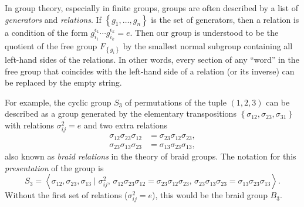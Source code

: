 \documentclass[english,letterpaper]{article}%
\numberwithin{equation}{section}
\numberwithin{figure}{section}
\numberwithin{table}{section}
\theoremstyle{definition}
\theoremstyle{definition}
\theoremstyle{definition}
\theoremstyle{plain}
\theoremstyle{plain}
\theoremstyle{plain}
\theoremstyle{plain}
\theoremstyle{remark}
\theoremstyle{remark}
\begin{document}
\begin{rem*}
In group theory, especially in finite groups, groups are often described
by a list of \emph{generators} and \emph{relations}. If $\left\{ g_{1},\ldots,g_{n}\right\} $
is the set of generators, then a relation is a condition of the form
$g_{i_{1}}^{\epsilon_{1}}\cdots g_{i_{k}}^{\epsilon_{k}}=e$. Then
our group is understood to be the quotient of the free group $F_{\left\{ g_{i}\right\} }$
by the smallest normal subgroup containing all left-hand sides of the
relations. In other words, every section of any ``word'' in the
free group that coincides with the left-hand side of a relation (or
its inverse) can be replaced by the empty string.

For example, the cyclic group $S_{3}$ of permutations of the tuple $(1,2,3) $
can be described as a group generated by the elementary transpositions
$\left\{ \sigma_{12},\sigma_{23},\sigma_{31}\right\} $ with relations
$\sigma_{ij}^{2}=e$ and two extra relations
\begin{align}
\sigma_{12}\sigma_{23}\sigma_{12} & =\sigma_{23}\sigma_{12}\sigma_{23},\nonumber \\
\sigma_{23}\sigma_{13}\sigma_{23} & =\sigma_{13}\sigma_{23}\sigma_{13},
\end{align}
also known as \emph{braid relations} in the theory of braid groups.
The notation for this \emph{presentation} of the group is
\begin{equation}
S_{3}=\left\langle \sigma_{12},\sigma_{23},\sigma_{13}\mid\sigma_{ij}^{2},\,\sigma_{12}\sigma_{23}\sigma_{12}=\sigma_{23}\sigma_{12}\sigma_{23},\,\sigma_{23}\sigma_{13}\sigma_{23}=\sigma_{13}\sigma_{23}\sigma_{13}\right\rangle .
\end{equation}
Without the first set of relations ($\sigma_{ij}^{2}=e$), this would
be the braid group $B_{3}$.
\end{rem*}
%
\end{document}
